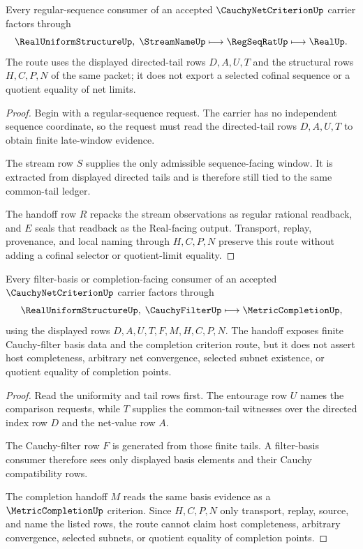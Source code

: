 \begin{theorem}
\label{thm:cauchy-net-criterion-regular-sequence-handoff}
Every regular-sequence consumer of an accepted $\CauchyNetCriterionUp$ carrier factors through
$$
\RealUniformStructureUp,\;\StreamNameUp
\longmapsto
\RegSeqRatUp
\longmapsto
\RealUp .
$$
The route uses the displayed directed-tail rows $D,A,U,T$ and the structural rows $H,C,P,N$ of the same packet; it does not export a selected cofinal sequence or a quotient equality of net limits.
\end{theorem}
\begin{proof}
Begin with a regular-sequence request. The carrier has no independent sequence coordinate, so the request must read the directed-tail rows $D,A,U,T$ to obtain finite late-window evidence.

The stream row $S$ supplies the only admissible sequence-facing window. It is extracted from displayed directed tails and is therefore still tied to the same common-tail ledger.

The handoff row $R$ repacks the stream observations as regular rational readback, and $E$ seals that readback as the Real-facing output. Transport, replay, provenance, and local naming through $H,C,P,N$ preserve this route without adding a cofinal selector or quotient-limit equality.
\end{proof}

\begin{theorem}
\label{thm:cauchy-net-criterion-filter-basis-handoff}
Every filter-basis or completion-facing consumer of an accepted $\CauchyNetCriterionUp$ carrier factors through
$$
\RealUniformStructureUp,\;\CauchyFilterUp
\longmapsto
\MetricCompletionUp ,
$$
using the displayed rows $D,A,U,T,F,M,H,C,P,N$. The handoff exposes finite Cauchy-filter basis data and the completion criterion route, but it does not assert host completeness, arbitrary net convergence, selected subnet existence, or quotient equality of completion points.
\end{theorem}
\begin{proof}
Read the uniformity and tail rows first. The entourage row $U$ names the comparison requests, while $T$ supplies the common-tail witnesses over the directed index row $D$ and the net-value row $A$.

The Cauchy-filter row $F$ is generated from those finite tails. A filter-basis consumer therefore sees only displayed basis elements and their Cauchy compatibility rows.

The completion handoff $M$ reads the same basis evidence as a $\MetricCompletionUp$ criterion. Since $H,C,P,N$ only transport, replay, source, and name the listed rows, the route cannot claim host completeness, arbitrary convergence, selected subnets, or quotient equality of completion points.
\end{proof}

